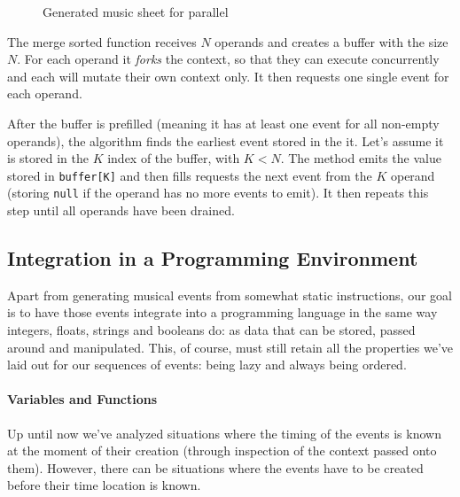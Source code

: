 \documentclass[a4paper,UKenglish,cleveref, autoref]{oasics-v2019}
\begin{document}
\begin{figure}[h]
  \centering
  {%
  \setlength{\fboxsep}{0pt}%
  \setlength{\fboxrule}{0pt}%
  }%
  \caption{Generated music sheet for parallel}
  \label{fig:parallel}
\end{figure}

The merge sorted function receives $N$ operands and creates a buffer with the size $N$. For each operand it \textit{forks} the context, so that they can execute concurrently and each will mutate their own context only. It then requests one single event for each operand.

After the buffer is prefilled (meaning it has at least one event for all non-empty operands), the algorithm finds the earliest event stored in the it. Let's assume it is stored in the $K$ index of the buffer, with $K < N$. The method emits the value stored in \texttt{buffer[K]} and then fills requests the next event from the $K$ operand (storing \texttt{null} if the operand has no more events to emit). It then repeats this step until all operands have been drained.

\subsection{Integration in a Programming Environment}
Apart from generating musical events from somewhat static instructions, our goal is to have those events integrate into a programming language in the same way integers, floats, strings and booleans do: as data that can be stored, passed around and manipulated. This, of course, must still retain all the properties we've laid out for our sequences of events: being lazy and always being ordered.

\paragraph*{Variables and Functions}
Up until now we've analyzed situations where the timing of the events is known at the moment of their creation (through inspection of the context passed onto them). However, there can be situations where the events have to be created before their time location is known.
\end{document}

